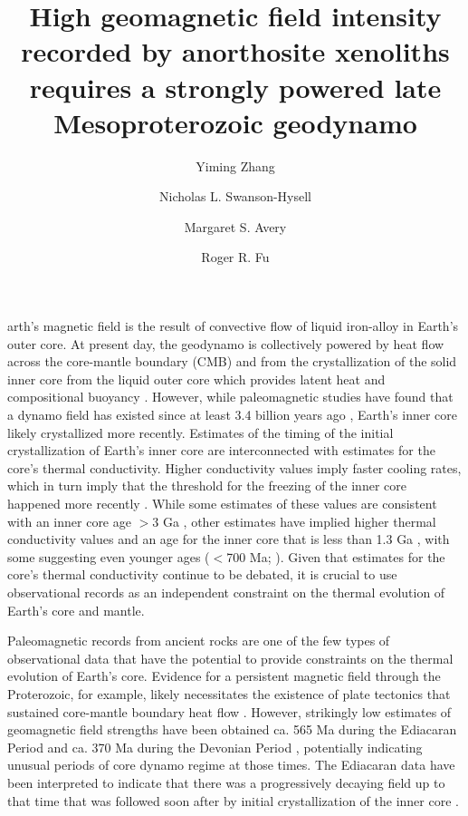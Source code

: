 \documentclass[9pt,twocolumn,twoside,lineno]{pnas-new}
\title{High geomagnetic field intensity recorded by anorthosite xenoliths requires a strongly powered late Mesoproterozoic geodynamo}
\author[a,1]{Yiming Zhang}
\author[a]{Nicholas L. Swanson-Hysell}
\author[a,b]{Margaret S. Avery}
\author[c]{Roger R. Fu}
\affil[a]{Department of Earth and Planetary Science, University of California, Berkeley, CA, 94720}
\affil[b]{Geology, Minerals, Energy, and Geophysics Science Center, U.S. Geological Survey, Moffett Field, CA, 94025}
\affil[c]{Department of Earth and Planetary Sciences, Harvard University, Cambridge, MA, 02138}
\begin{document}
\maketitle
\thispagestyle{firststyle}

arth's magnetic field is the result of convective flow of liquid iron-alloy in Earth's outer core. At present day, the geodynamo is collectively powered by heat flow across the core-mantle boundary (CMB) and from the crystallization of the solid inner core from the liquid outer core which provides latent heat and compositional buoyancy \cite{Buffett2000a}. However, while paleomagnetic studies have found that a dynamo field has existed since at least 3.4 billion years ago \cite{Selkin2007a, Tarduno2014a, Brenner2020a}, Earth's inner core likely crystallized more recently. Estimates of the timing of the initial crystallization of Earth's inner core are interconnected with estimates for the core's thermal conductivity. Higher conductivity values imply faster cooling rates, which in turn imply that the threshold for the freezing of the inner core happened more recently \cite{Davies2015a}. While some estimates of these values are consistent with an inner core age $>$3 Ga \cite{Gubbins2004a, Konopkova2016a}, other estimates have implied higher thermal conductivity values and an age for the inner core that is less than 1.3 Ga \cite{Pozzo2012a, Koker2012a, Gomi2013a, Zhang2020b}, with some suggesting even younger ages ($<$700 Ma;  \citealp{Labrosse2015a, Ohta2016a}). Given that estimates for the core's thermal conductivity continue to be debated, it is crucial to use observational records as an independent constraint on the thermal evolution of Earth's core and mantle.

Paleomagnetic records from ancient rocks are one of the few types of observational data that have the potential to provide constraints on the thermal evolution of Earth’s core. Evidence for a persistent magnetic field through the Proterozoic, for example, likely necessitates the existence of plate tectonics that sustained core-mantle boundary heat flow \cite{Swanson-Hysell2021c}. However, strikingly low estimates of geomagnetic field strengths have been obtained ca. 565 Ma during the Ediacaran Period \cite{Bono2019a, Shcherbakova2019a,Thallner2021b} and ca. 370 Ma during the Devonian Period \cite{Shcherbakova2017a, Shcherbakova2021a, Hawkins2021a}, potentially indicating unusual periods of core dynamo regime at those times. The Ediacaran data have been interpreted to indicate that there was a progressively decaying field up to that time that was followed soon after by initial crystallization of the inner core \cite{Bono2019a}.
\end{document}
